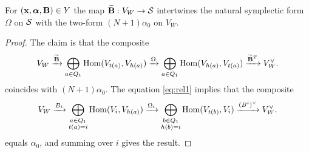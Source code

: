 \documentclass{amsart}
\newcommand{\balpha}{\boldsymbol{\alpha}}
\theoremstyle{definition}
\newcommand\VW{V_W}
\newcommand\Y{Y}
\begin{document}

\begin{lemma}\label{lem:symp2}
For $(\bfx, \balpha, \bfB) \in \Y$ the map $\widetilde{\bfB}: \VW \to \cS$ intertwines the natural symplectic form $\Omega$ on $\mathcal{S}$ with the two-form $(N+1)\alpha_0$ on $\VW$.
\end{lemma}

\begin{proof}
The claim is that the composite
\begin{equation}
    \VW \xrightarrow{\widetilde{\bfB}} \bigoplus_{a \in Q_1} \Hom(V_{t(a)}, V_{h(a)}) \xrightarrow{\Omega} \bigoplus_{a \in Q_1} \Hom(V_{h(a)}, V_{t(a)}) \xrightarrow{\widetilde{\bfB}^T} \VW^\vee.
\end{equation}
coincides with $(N+1)\alpha_0$. The equation \eqref{eq:rel1} implies that the composite
\begin{equation}
    \VW \xrightarrow{B_i} \bigoplus_{\substack{a \in Q_1\\t(a)=i}} \Hom(V_i, V_{h(a)}) \xrightarrow{\Omega_i} \bigoplus_{\substack{b \in Q_1\\h(b)=i}} \Hom(V_{t(b)}, V_{i}) \xrightarrow{(B^i)^\vee} \VW^\vee.
\end{equation}
equals $\alpha_0$, and summing over $i$ gives the result.
\end{proof}
\end{document}
